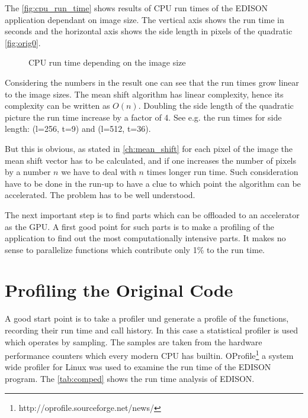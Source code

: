 The \autoref{fig:cpu_run_time} shows results of \gls{CPU} run times of
the \gls{EDISON} application dependant on image size. The vertical
axis shows the run time in seconds and the horizontal axis shows the
side length in pixels of the quadratic \autoref{fig:orig0}.
\begin{figure}[ht]
  \centering
  \caption{CPU run time depending on the image size}\label{fig:cpu_run_time}%
\end{figure}
Considering the numbers in the result one can see that the run times
grow linear to the image sizes. The mean shift algorithm has linear
complexity, hence its complexity can be written as $O(n)$. Doubling
the side length of the quadratic picture the run time increase by a
factor of 4. See e.g.  the run times for side length: (l=256, t=9) and
(l=512, t=36).
    
But this is obvious, as stated in \autoref{ch:mean_shift} for each
pixel of the image the mean shift vector has to be calculated, and if
one increases the number of pixels by a number $n$ we have to deal
with $n$ times longer run time. Such consideration have to be done in
the run-up to have a clue to which point the algorithm can be
accelerated. The problem has to be well understood.

The next important step is to find parts which can be offloaded to an
accelerator as the \gls{GPU}. A first good point for such parts is to
make a profiling of the application to find out the most
computationally intensive parts. It makes no sense to parallelize
functions which contribute only 1\% to the run time.
    
\section{Profiling the Original Code} %
\label{sec:run_time_analysis_of_the_original_code}
A good start point is to take a profiler und generate a profile of the
functions, recording their run time and call history. In this case a
statistical profiler is used which operates by sampling. The samples
are taken from the hardware performance counters which every modern
\gls{CPU} has builtin.
OProfile\footnote{http://oprofile.sourceforge.net/news/} a system wide
profiler for Linux was used to examine the run time of the
\gls{EDISON} program. The \autoref{tab:comped} shows the run time
analysis of \gls{EDISON}.

